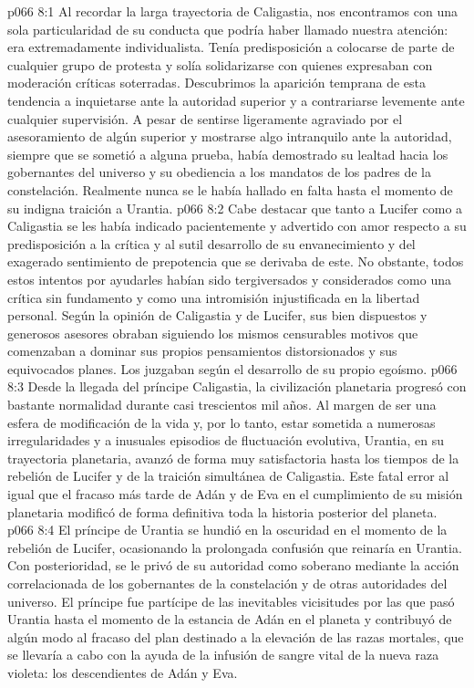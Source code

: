 \vs p066 8:1 Al recordar la larga trayectoria de Caligastia, nos encontramos con una sola particularidad de su conducta que podría haber llamado nuestra atención: era extremadamente individualista. Tenía predisposición a colocarse de parte de cualquier grupo de protesta y solía solidarizarse con quienes expresaban con moderación críticas soterradas. Descubrimos la aparición temprana de esta tendencia a inquietarse ante la autoridad superior y a contrariarse levemente ante cualquier supervisión. A pesar de sentirse ligeramente agraviado por el asesoramiento de algún superior y mostrarse algo intranquilo ante la autoridad, siempre que se sometió a alguna prueba, había demostrado su lealtad hacia los gobernantes del universo y su obediencia a los mandatos de los padres de la constelación. Realmente nunca se le había hallado en falta hasta el momento de su indigna traición a Urantia.
\vs p066 8:2 Cabe destacar que tanto a Lucifer como a Caligastia se les había indicado pacientemente y advertido con amor respecto a su predisposición a la crítica y al sutil desarrollo de su envanecimiento y del exagerado sentimiento de prepotencia que se derivaba de este. No obstante, todos estos intentos por ayudarles habían sido tergiversados y considerados como una crítica sin fundamento y como una intromisión injustificada en la libertad personal. Según la opinión de Caligastia y de Lucifer, sus bien dispuestos y generosos asesores obraban siguiendo los mismos censurables motivos que comenzaban a dominar sus propios pensamientos distorsionados y sus equivocados planes. Los juzgaban según el desarrollo de su propio egoísmo.
\vs p066 8:3 \pc Desde la llegada del príncipe Caligastia, la civilización planetaria progresó con bastante normalidad durante casi trescientos mil años. Al margen de ser una esfera de modificación de la vida y, por lo tanto, estar sometida a numerosas irregularidades y a inusuales episodios de fluctuación evolutiva, Urantia, en su trayectoria planetaria, avanzó de forma muy satisfactoria hasta los tiempos de la rebelión de Lucifer y de la traición simultánea de Caligastia. Este fatal error al igual que el fracaso más tarde de Adán y de Eva en el cumplimiento de su misión planetaria modificó de forma definitiva toda la historia posterior del planeta.
\vs p066 8:4 El príncipe de Urantia se hundió en la oscuridad en el momento de la rebelión de Lucifer, ocasionando la prolongada confusión que reinaría en Urantia. Con posterioridad, se le privó de su autoridad como soberano mediante la acción correlacionada de los gobernantes de la constelación y de otras autoridades del universo. El príncipe fue partícipe de las inevitables vicisitudes por las que pasó Urantia hasta el momento de la estancia de Adán en el planeta y contribuyó de algún modo al fracaso del plan destinado a la elevación de las razas mortales, que se llevaría a cabo con la ayuda de la infusión de sangre vital de la nueva raza violeta: los descendientes de Adán y Eva.
